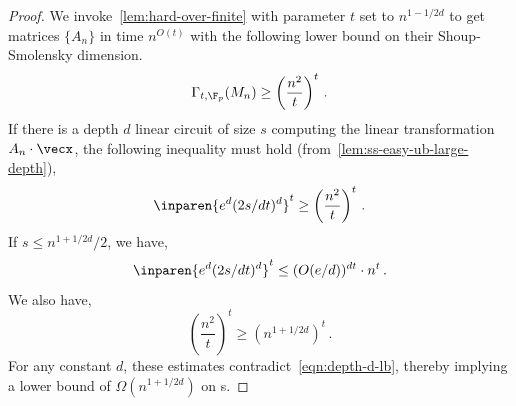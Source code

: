 \begin{proof}
We invoke~\autoref{lem:hard-over-finite} with parameter $t$ set to  $n^{1-1/2d}$ to get matrices $\{A_n\}$ in time $n^{O(t)}$ with the following lower bound on their Shoup-Smolensky dimension. 
\[
\Gamma_{t, \F_p}(M_{n}) \geq \left(\frac{n^2}{t}\right)^t\, .
\] 
If there is a  depth $d$ linear circuit of size $s$ computing the linear transformation $A_n\cdot \vecx$, the following inequality must hold (from~\autoref{lem:ss-easy-ub-large-depth}),
\begin{equation}\label{eqn:depth-d-lb}
\inparen{e^d (2s/dt)^d}^t \geq \left(\frac{n^2}{t}\right)^t \, .
\end{equation}
If $s \leq   n^{1+1/2d}/2$, we have, 
\[
\inparen{e^d (2s/dt)^d}^t \leq (O(e/d))^{dt} \cdot n^t\, . 
\]
We also have, 
\[
\left(\frac{n^2}{t}\right)^t \geq \left(n^{1 + 1/2d} \right)^t \, .
\]
For any constant $d$, these estimates contradict~\autoref{eqn:depth-d-lb}, thereby implying a lower bound of $\Omega(n^{1+1/2d})$ on s. 
\end{proof}

